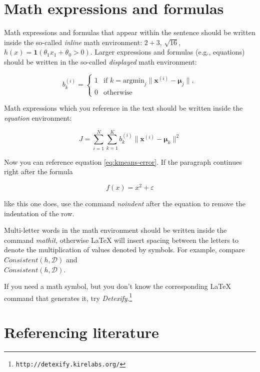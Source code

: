 \documentclass[10pt, a4paper]{article}
\begin{document}
\section{Math expressions and formulas}

Math expressions and formulas that appear within the sentence should be written inside the so-called \emph{inline} math environment: $2+3$, $\sqrt{16}$, $h(x)=\mathbf{1}(\theta_1 x_1 + \theta_0>0)$. Larger expressions and formulas (e.g., equations) should be written in the so-called \emph{displayed} math environment:

\[
b^{(i)}_k = \begin{cases}
1 & \text{if
    $k = \text{argmin}_j \| \mathbf{x}^{(i)} - \mathbf{\mu}_j \|,$}\\
0 & \text{otherwise}
\end{cases}
\]

Math expressions which you reference in the text should be written inside the \textit{equation} environment:

\begin{equation}\label{eq:kmeans-error}
J = \sum_{i=1}^N \sum_{k=1}^K
b^{(i)}_k \| \mathbf{x}^{(i)} - \mathbf{\mu}_k \|^2
\end{equation}

Now you can reference equation \eqref{eq:kmeans-error}. If the paragraph continues right after the formula

\begin{equation}
f(x) = x^2 + \varepsilon
\end{equation}

\noindent like this one does, use the command \emph{noindent} after the equation to remove the indentation of the row.

Multi-letter words in the math environment should be written inside the command \emph{mathit}, otherwise \LaTeX{} will insert spacing between the letters to denote the multiplication of values denoted by symbols. For example, compare
$\mathit{Consistent}(h,\mathcal{D})$ and\\
$Consistent(h,\mathcal{D})$.

If you need a math symbol, but you don't know the corresponding \LaTeX{} command that generates it, try
\emph{Detexify}.\footnote{\texttt{http://detexify.kirelabs.org/}}

\section{Referencing literature}
\end{document}
